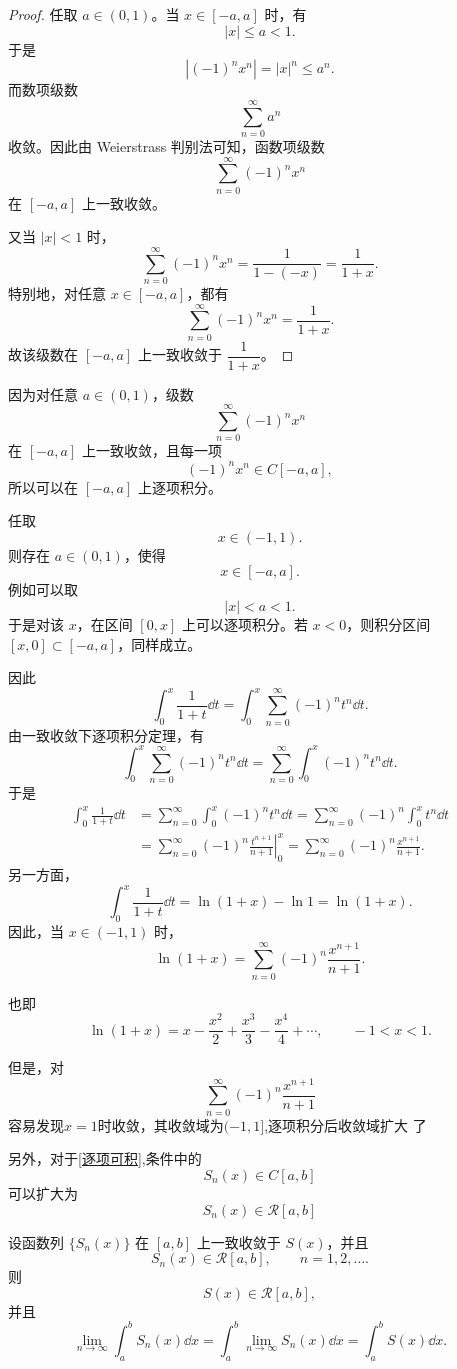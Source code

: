 \begin{proof}
	任取 $a\in(0,1)$。当 $x\in[-a,a]$ 时，有
	\[
	|x|\leq a<1.
	\]
	于是
	\[
	|(-1)^n x^n|=|x|^n\leq a^n.
	\]
	而数项级数
	\[
	\sum_{n=0}^{\infty}a^n
	\]
	收敛。因此由 Weierstrass 判别法可知，函数项级数
	\[
	\sum_{n=0}^{\infty}(-1)^n x^n
	\]
	在 $[-a,a]$ 上一致收敛。
	
	又当 $|x|<1$ 时，
	\[
	\sum_{n=0}^{\infty}(-1)^n x^n
	=
	\frac{1}{1-(-x)}
	=
	\frac{1}{1+x}.
	\]
	特别地，对任意 $x\in[-a,a]$，都有
	\[
	\sum_{n=0}^{\infty}(-1)^n x^n
	=
	\frac{1}{1+x}.
	\]
	故该级数在 $[-a,a]$ 上一致收敛于 $\dfrac{1}{1+x}$。
\end{proof}



因为对任意 $a\in(0,1)$，级数
\[
\sum_{n=0}^{\infty}(-1)^n x^n
\]
在 $[-a,a]$ 上一致收敛，且每一项
\[
(-1)^n x^n\in C[-a,a],
\]
所以可以在 $[-a,a]$ 上逐项积分。

任取
\[
x\in(-1,1).
\]
则存在 $a\in(0,1)$，使得
\[
x\in[-a,a].
\]
例如可以取
\[
|x|<a<1.
\]
于是对该 $x$，在区间 $[0,x]$ 上可以逐项积分。若 $x<0$，则积分区间 $[x,0]\subset[-a,a]$，同样成立。

因此
\[
\int_0^x \frac{1}{1+t}\dd t
=
\int_0^x \sum_{n=0}^{\infty}(-1)^n t^n\dd t .
\]
由一致收敛下逐项积分定理，有
\[
\int_0^x \sum_{n=0}^{\infty}(-1)^n t^n\dd t
=
\sum_{n=0}^{\infty}\int_0^x (-1)^n t^n\dd t .
\]
于是
\[
\begin{aligned}
	\int_0^x \frac{1}{1+t}\dd t
	&=
	\sum_{n=0}^{\infty}\int_0^x (-1)^n t^n\dd t =
	\sum_{n=0}^{\infty}(-1)^n\int_0^x t^n\dd t  \\
	&=
	\sum_{n=0}^{\infty}(-1)^n
	\left.\frac{t^{n+1}}{n+1}\right|_0^x  =
	\sum_{n=0}^{\infty}(-1)^n\frac{x^{n+1}}{n+1}.
\end{aligned}
\]
另一方面，
\[
\int_0^x \frac{1}{1+t}\dd t
=
\ln(1+x)-\ln 1
=
\ln(1+x).
\]
因此，当 $x\in(-1,1)$ 时，
\[
\boxed{
	\ln(1+x)
	=
	\sum_{n=0}^{\infty}(-1)^n\frac{x^{n+1}}{n+1}
}.
\]

也即
\[
\ln(1+x)
=
x-\frac{x^2}{2}+\frac{x^3}{3}-\frac{x^4}{4}+\cdots,
\qquad -1<x<1.
\]

但是，对
	\[\sum_{n=0}^{\infty}(-1)^n\frac{x^{n+1}}{n+1}\]
容易发现$x=1$时收敛，其收敛域为$(-1,1]$,逐项积分后收敛域扩大 了


另外，对于\ref{逐项可积},条件中的\[S_n(x)\in C[a,b]\]可以扩大为\[S_n(x)\in \mathcal{R}[a,b]\]
\begin{proposition}
		设函数列 $\{S_n(x)\}$ 在 $[a,b]$ 上一致收敛于 $S(x)$，并且
	\[
	S_n(x)\in \mathcal{R}[a,b],\qquad n=1,2,\dots .
	\]
	则
	\[
	S(x)\in \mathcal{R}[a,b],
	\]
	并且
	\[
	\lim_{n\to\infty}\int_a^b S_n(x)\dd x 
	=
	\int_a^b \lim_{n\to\infty}S_n(x)\dd x 
	=
	\int_a^b S(x)\dd x .
	\]
\end{proposition}

